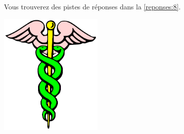 Vous trouverez des pistes de réponses dans la \autoref{reponses:8}.
 \vfill
\begin{center}
 \includegraphics[width=5cm]{images/Caduceus.pdf}
\end{center}
 \vfill

\newpage
\thispagestyle{empty}
